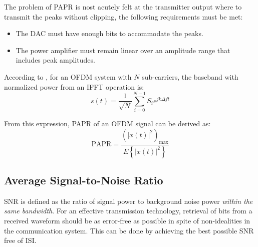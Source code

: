 The problem of \gls{PAPR} is nost acutely felt at the transmitter output where to transmit the peaks without clipping, the following requirements must be met\cite{ofdm_intro}:
\begin{itemize}
	\item The \gls{DAC} must have enough bits to accommodate the peaks.
	\item The power amplifier must remain linear over an amplitude range that includes peak amplitudes.
\end{itemize}
According to \cite{papr_paper}, for an OFDM system with \(N\) sub-carriers, the baseband with normalized power from an IFFT operation is:
\begin{equation}
	s(t) = \frac{1}{\sqrt{N}} \sum_{i=0}^{N-1} S_i e^{jk\Delta ft}
\end{equation}
\begin{mathDef}
\end{mathDef}
From this expression, \gls{PAPR} of an OFDM signal can be derived as:
\begin{equation}
	\text{PAPR} = \frac{\left( |x(t)|^2 \right)_\text{max}}{E\left\{ |x(t)|^2 \right\}}
\end{equation}
\begin{mathDef}
\end{mathDef}

\subsection{Average Signal-to-Noise Ratio}
\gls{SNR} is defined as the ratio of signal power to background noise power \emph{within the same bandwidth}\cite{dcommoha}.
For an effective transmission technology, retrieval of bits from a received waveform should be as error-free as possible in spite of non-idealities in the communication system. This can be done by achieving the best possible \gls{SNR} free of \gls{ISI}.

